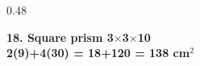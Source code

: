 \documentclass[aspectratio=169,12pt]{beamer}
\begin{document}
\begin{frame}[t]
\begin{columns}[T,onlytextwidth]
\begin{column}{0.48\textwidth}\begin{AnsCard}\small\textcolor{mmgreenDeep}{\textbf{18. Square prism 3$\times$3$\times$10}}\\\vspace{0.1em}\textcolor{mmanswerColor}{\textbf{2(9)+4(30) = 18+120 = 138 cm$^2$}}\end{AnsCard}\end{column}
\end{columns}
\end{frame}
\end{document}

